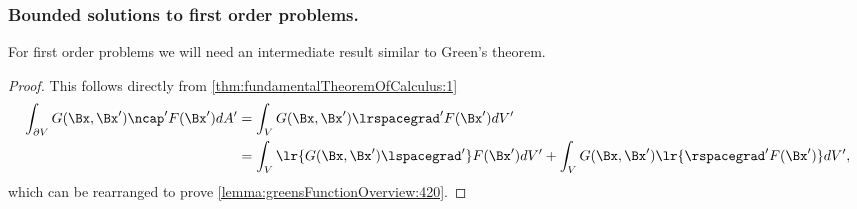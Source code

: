 \subsubsection{Bounded solutions to first order problems.}

For first order problems we will need an intermediate result similar to Green's theorem.

\begin{proof}
This follows directly from \cref{thm:fundamentalTheoremOfCalculus:1}
\begin{equation}\label{eqn:greensFunctionSolutions:440}
\begin{aligned}
\int_{\partial V} G(\Bx, \Bx') \ncap' F(\Bx') dA'
&= \int_V G(\Bx, \Bx') \lrspacegrad' F(\Bx') dV' \\
&= \int_V \lr{ G(\Bx, \Bx') \lspacegrad' } F(\Bx') dV' + \int_V G(\Bx, \Bx') \lr{ \rspacegrad' F(\Bx') } dV',
\end{aligned}
\end{equation}
which can be rearranged to prove \cref{lemma:greensFunctionOverview:420}.
\end{proof}
